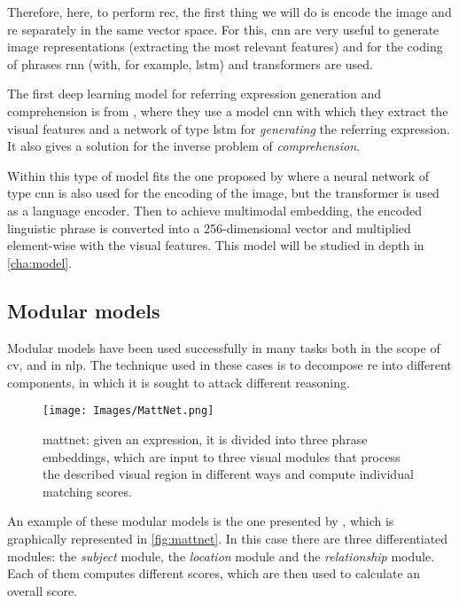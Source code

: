 Therefore, here, to perform \gls{rec}, the first thing we will do is encode the
image and \gls{re} separately in the same vector space. For this, \gls{cnn} are
very useful to generate image representations (extracting the most relevant
features) and for the coding of phrases \gls{rnn} (with, for example,
\gls{lstm}) and transformers are used.

The first deep learning model for referring expression generation and
comprehension is from , where they use a model \gls{cnn}
with which they extract the visual features and a network of type \gls{lstm}
for \emph{generating} the referring expression. It also gives a solution for the
inverse problem of \emph{comprehension}.

Within this type of model fits the one proposed by 
where a neural network of type \gls{cnn} is also used for the encoding of the
image, but the transformer is used as a language encoder. Then to achieve
multimodal embedding, the encoded linguistic phrase is converted into a
256-dimensional vector and multiplied element-wise with the visual
features. This model will be studied in depth in \vref{cha:model}.

\subsection{Modular models} \label{sec:modular}
Modular models have been used successfully in many tasks both in the scope of
\gls{cv}, and in \gls{nlp}. The technique used in these cases is to decompose
\gls{re} into different components, in which it is sought to attack different
reasoning.

\begin{figure}[ht]
  \centering
  \texttt{[image: Images/MattNet.png]}
  \caption[\acl*{mattnet}]{\gls{mattnet}: given an expression, it is divided
    into three phrase embeddings, which are input to three visual modules that
    process the described visual region in different ways and compute
    individual matching scores.}
  \label{fig:mattnet}
\end{figure}

An example of these modular models is the one presented by ,
which is graphically represented in \vref{fig:mattnet}. In this case there are
three differentiated modules: the \emph{subject} module, the \emph{location}
module and the \emph{relationship} module. Each of them computes different
scores, which are then used to calculate an overall score.

